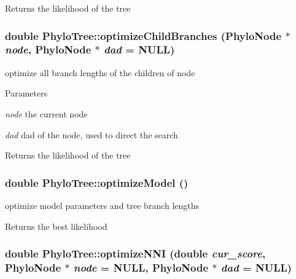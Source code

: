 \begin{DoxyReturn}{Returns}
the likelihood of the tree 
\end{DoxyReturn}
\hypertarget{classPhyloTree_aaad81a0e6fc24cfb5b665655059bc17b}{
\subsubsection[{optimizeChildBranches}]{\setlength{\rightskip}{0pt plus 5cm}double PhyloTree::optimizeChildBranches ({\bf PhyloNode} $\ast$ {\em node}, \/  {\bf PhyloNode} $\ast$ {\em dad} = {\ttfamily NULL})}}
\label{classPhyloTree_aaad81a0e6fc24cfb5b665655059bc17b}
optimize all branch lengths of the children of node 
\begin{DoxyParams}{Parameters}
\item[{\em node}]the current node \item[{\em dad}]dad of the node, used to direct the search \end{DoxyParams}
\begin{DoxyReturn}{Returns}
the likelihood of the tree 
\end{DoxyReturn}
\hypertarget{classPhyloTree_a1e1bf7936bb8a7dbacd92f93dad6d531}{
\subsubsection[{optimizeModel}]{\setlength{\rightskip}{0pt plus 5cm}double PhyloTree::optimizeModel ()}}
\label{classPhyloTree_a1e1bf7936bb8a7dbacd92f93dad6d531}
optimize model parameters and tree branch lengths \begin{DoxyReturn}{Returns}
the best likelihood 
\end{DoxyReturn}
\hypertarget{classPhyloTree_abd42e1cc3b3da9e0d00ea00182a031d2}{
\subsubsection[{optimizeNNI}]{\setlength{\rightskip}{0pt plus 5cm}double PhyloTree::optimizeNNI (double {\em cur\_\-score}, \/  {\bf PhyloNode} $\ast$ {\em node} = {\ttfamily NULL}, \/  {\bf PhyloNode} $\ast$ {\em dad} = {\ttfamily NULL})}}
